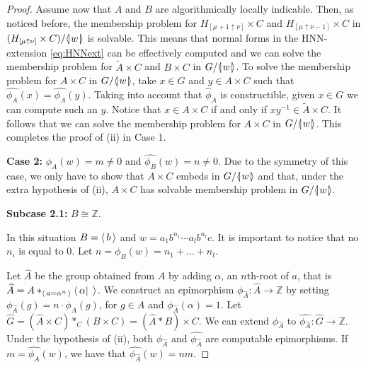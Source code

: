\documentclass[12pt, a4paper]{amsart}
\theoremstyle{remark}
\theoremstyle{definition}
\begin{document}
\begin{proof}
Assume now that $A$ and $B$ are algorithmically locally indicable. Then, as noticed before, the membership problem for $H_{[\mu+1\uparrow \nu]}\times C$ and $H_{[\mu\uparrow \nu-1]}\times C$  in $(H_{[\mu\uparrow \nu]}\times C)/{{\langle}{\mkern-3.7mu}{\lvert}{\mkern1.2mu}{{w}}{\mkern1.2mu}{\rvert}{\mkern-3.7mu}{\rangle}}$ is solvable. This means that normal forms in the HNN-extension \eqref{eq:HNNext} can be effectively computed and we can solve the membership problem for $\tilde{A}\times C$ and $B\times C$ in $G/{{\langle}{\mkern-3.7mu}{\lvert}{\mkern1.2mu}{{w}}{\mkern1.2mu}{\rvert}{\mkern-3.7mu}{\rangle}}$. To solve the membership problem for $A\times C$ in $G/{{\langle}{\mkern-3.7mu}{\lvert}{\mkern1.2mu}{{w}}{\mkern1.2mu}{\rvert}{\mkern-3.7mu}{\rangle}}$, take $x\in G$ and $y\in A\times C$ such that $\widehat{\phi_A}(x)=\widehat{\phi_A}(y)$. Taking into account that $\widehat{\phi}_A$ is constructible, given $x\in G$ we can compute such an $y$. Notice that $x\in A\times C$ if and only if $xy^{-1}\in \tilde{A}\times C$.  It follows that  we can solve the membership problem for $A\times C$  in $G/{{\langle}{\mkern-3.7mu}{\lvert}{\mkern1.2mu}{{w}}{\mkern1.2mu}{\rvert}{\mkern-3.7mu}{\rangle}}$. This completes the proof of (ii) in Case 1.

\textbf{Case 2:} $\widehat{\phi_A}(w)=m\neq 0$ and $\widehat{\phi_B}(w)=n\neq 0.$
Due to the symmetry of this case, we only have to show that $A\times C$ embeds in $G/{{\langle}{\mkern-3.7mu}{\lvert}{\mkern1.2mu}{{w}}{\mkern1.2mu}{\rvert}{\mkern-3.7mu}{\rangle}}$ and that, under the extra hypothesis of (ii), $A\times C$ has solvable membership problem in $G/{{\langle}{\mkern-3.7mu}{\lvert}{\mkern1.2mu}{{w}}{\mkern1.2mu}{\rvert}{\mkern-3.7mu}{\rangle}}.$ 

\textbf{Subcase 2.1:} $B\cong {\mathbb{Z}}.$

In this situation $B={\langle\mkern3mu{b}\mkern3mu\rangle}$ and $w=a_1 b^{n_1}\cdots a_lb^{n_l}c$. It is important to notice that no $n_i$ is equal to 0. Let  $n=\phi_B(w)=n_1+\dots +n_l.$ 

Let $\widehat{A}$ be the group obtained from $A$ by adding $\alpha$, an $n$th-root of $a$, that is  $\widehat{A}=A*_{{\langle\mkern3mu{a=\alpha^n}\mkern3mu\rangle}}{\langle\mkern3mu{\alpha| \;}\mkern3mu\rangle}$. We construct an epimorphism $\phi_{\widehat{A}}\colon\widehat{A}\to {\mathbb{Z}}$  by setting $\phi_{\widehat{A}}(g)=n\cdot \phi_A(g)$, for $g\in A$ and  $\phi_{\widehat{A}}(\alpha)=1$.  Let $\widehat{G}=(\widehat{A}\times C)*_C(B\times C)=(\widehat{A}*B)\times C.$ We can extend $\phi_{\widehat{A}}$ to $\widehat{\phi_{\widehat{A}}}\colon \widehat{G}\to {\mathbb{Z}}.$ Under the hypothesis of (ii), both $\phi_{\widehat{A}}$ and $\widehat{\phi_{\widehat{A}}}$ are computable epimorphisms. If $m=\widehat{\phi_A}(w)$, we have that $\widehat{\phi_{\widehat{A}}}(w)=nm$.


\end{proof}
\end{document}
